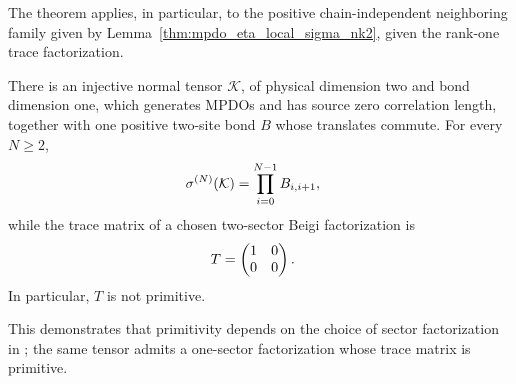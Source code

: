 \begin{remark}
    The theorem applies, in particular, to the positive chain-independent
    neighboring family given by
    Lemma~\ref{thm:mpdo_eta_local_sigma_nk2}, given the rank-one trace
    factorization.
\end{remark}

\begin{lemma}
    \label{thm:mpdo_commuting_bond_trace_matrix_primitivity_obstruction}
    \leanok
    There is an injective normal tensor $\mathcal K$, of physical dimension two
    and bond dimension one, which generates MPDOs and has source zero
    correlation length, together with one positive two-site bond $B$ whose
    translates commute. For every $N\geq2$,
    \begin{align}
        \sigma^{(N)}(\mathcal K)
         & =\prod_{i=0}^{N-1}B_{i,i+1},
        \notag
    \end{align}
    while the trace matrix of a chosen two-sector Beigi factorization is
    \begin{align}
        T & =\begin{pmatrix}1&0\\0&0\end{pmatrix}.
        \notag
    \end{align}
    In particular, $T$ is not primitive.

    This demonstrates that primitivity depends on the choice of sector
    factorization in \cite[Appendix~C.2, line~1613]{Cirac2016MPDO_arXiv};
    the same tensor admits a one-sector factorization whose trace matrix
    is primitive.
\end{lemma}

